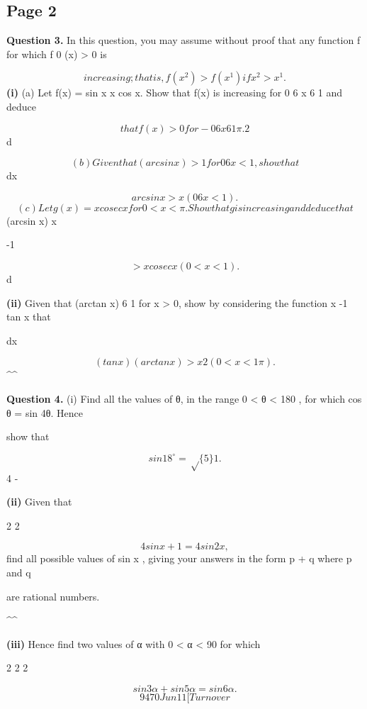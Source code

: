\documentclass[12pt]{article}
\begin{document}
\subsection*{Page 2}
\begin{flushleft}
\bigskip\textbf{Question 3.} In this question, you may assume without proof that any function f for which f 0 (x) > 0 is\par
\[increasing; that is, f(x^2) > f(x^1) if x^2 > x^1 .\]
\textbf{(i)} (a) Let f(x) = sin x x cos x. Show that f(x) is increasing for 0 6 x 6 1 \pi and deduce\par
\[that f(x) > 0 for - 0 6 x 6 1 \pi . 2\]
d\par
\[(b) Given that (arcsin x) > 1 for 0 6 x < 1, show that\]
dx\par
\[arcsin x > x (0 6 x < 1).\]
\[(c) Let g(x) = x cosec x for 0 < x < \pi. Show that g is increasing and deduce that\]
(arcsin x) x\par
-1\par
\[> x cosec x (0 < x < 1).\]
d\par
\textbf{(ii)} Given that (arctan x) 6 1 for x > 0, show by considering the function x -1 tan x that\par
dx\par
\[(tan x)(arctan x) > x 2 (0 < x < 1 \pi).\]
\textasciicircum{}\circ \textasciicircum{}\circ\par
\bigskip\textbf{Question 4.} (i) Find all the values of θ, in the range 0 < θ < 180 , for which cos θ = sin 4θ. Hence\par
show that\par
\[sin 18 ^\circ = \sqrt\{5\} 1 .\]
4 -\par
\gamma \delta\par
\textbf{(ii)} Given that\par
2 2\par
\[4 sin x + 1 = 4 sin 2x ,\]
find all possible values of sin x , giving your answers in the form p + q where p and q\par
are rational numbers.\par
\textasciicircum{}\circ \textasciicircum{}\circ\par
\textbf{(iii)} Hence find two values of α with 0 < α < 90 for which\par
2 2 2\par
\[sin 3α + sin 5α = sin 6α .\]
\[9470 Jun11 [Turn over\]
\end{flushleft}
\end{document}
